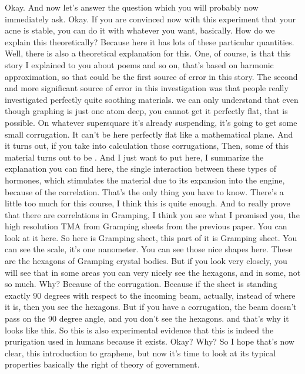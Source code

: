 Okay. And now let's answer the question which you will probably now immediately ask. Okay. If you are convinced now with this experiment that your acne is stable, you can do it with whatever you want, basically. How do we explain this theoretically? Because here it has lots of these particular quantities. Well, there is also a theoretical explanation for this. One, of course, is that this story I explained to you about poems and so on, that's based on harmonic approximation, so that could be the first source of error in this story. The second and more significant source of error in this investigation was that people really investigated perfectly quite soothing materials. we can only understand that even though graphing is just one atom deep, you cannot get it perfectly flat, that is possible. On whatever supersquare it's already suspending, it's going to get some small corrugation. It can't be here perfectly flat like a mathematical plane. And it turns out, if you take into calculation those corrugations, Then, some of this material turns out to be . And I just want to put here, I summarize the explanation you can find here, the single interaction between these types of hormones, which stimulates the material due to its expansion into the engine, because of the correlation. That's the only thing you have to know. There's a little too much for this course, I think this is quite enough. And to really prove that there are correlations in Gramping, I think you see what I promised you, the high resolution TMA from Gramping sheets from the previous paper. You can look at it here. So here is Gramping sheet, this part of it is Gramping sheet. You can see the scale, it's one nanometer. You can see those nice shapes here. These are the hexagons of Gramping crystal bodies. But if you look very closely, you will see that in some areas you can very nicely see the hexagons, and in some, not so much. Why? Because of the corrugation. Because if the sheet is standing exactly 90 degrees with respect to the incoming beam, actually, instead of where it is, then you see the hexagons. But if you have a corrugation, the beam doesn't pass on the 90 degree angle, and you don't see the hexagons. and that's why it looks like this. So this is also experimental evidence that this is indeed the prurigation used in humans because it exists. Okay? Why? So I hope that's now clear, this introduction to graphene, but now it's time to look at its typical properties basically the right of theory of government.
